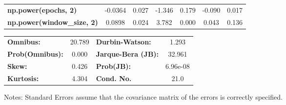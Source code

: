 \begin{center}
\begin{tabular}{lcccccc}
\textbf{np.power(epochs, 2)}         &      -0.0364  &        0.027     &    -1.346  &         0.179        &       -0.090    &        0.017     \\
\textbf{np.power(window\_size, 2)}   &       0.0898  &        0.024     &     3.782  &         0.000        &        0.043    &        0.136     \\
\bottomrule
\end{tabular}
\begin{tabular}{lclc}
\textbf{Omnibus:}       & 20.789 & \textbf{  Durbin-Watson:     } &    1.293  \\
\textbf{Prob(Omnibus):} &  0.000 & \textbf{  Jarque-Bera (JB):  } &   32.961  \\
\textbf{Skew:}          &  0.426 & \textbf{  Prob(JB):          } & 6.96e-08  \\
\textbf{Kurtosis:}      &  4.304 & \textbf{  Cond. No.          } &     21.0  \\
\bottomrule
\end{tabular}
\end{center}

Notes: \newline
 [1] Standard Errors assume that the covariance matrix of the errors is correctly specified.